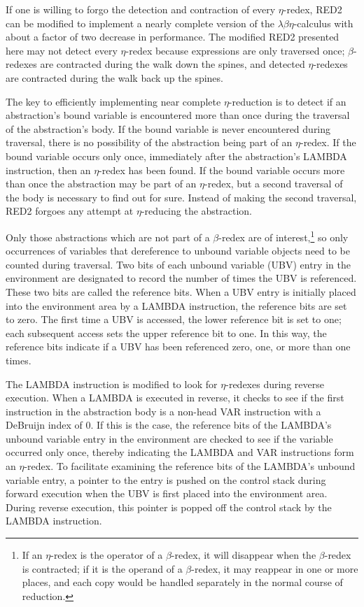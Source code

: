 If one is willing to forgo the detection and contraction of every
\(\eta\)-redex, RED2 can be modified to implement a nearly complete version of
the \(\lambda\beta\eta\)-calculus with about a factor of two decrease in
performance. The modified RED2 presented here may not detect every
\(\eta\)-redex because expressions are only traversed once; \(\beta\)-redexes
are contracted during the walk down the spines, and detected \(\eta\)-redexes
are contracted during the walk back up the spines.

The key to efficiently implementing near complete \(\eta\)-reduction is to
detect if an abstraction's bound variable is encountered more than once during
the traversal of the abstraction's body. If the bound variable is never
encountered during traversal, there is no possibility of the abstraction being
part of an \(\eta\)-redex. If the bound variable occurs only once, immediately
after the abstraction's LAMBDA instruction, then an \(\eta\)-redex has been
found. If the bound variable occurs more than once the abstraction may be part
of an \(\eta\)-redex, but a second traversal of the body is necessary to find
out for sure. Instead of making the second traversal, RED2 forgoes any attempt
at \(\eta\)-reducing the abstraction.

Only those abstractions which are not part of a \(\beta\)-redex are of
interest,\footnote{If an \(\eta\)-redex is the operator of a \(\beta\)-redex, it
will disappear when the \(\beta\)-redex is contracted; if it is the operand of a
\(\beta\)-redex, it may reappear in one or more places, and each copy would be
handled separately in the normal course of reduction.} so only occurrences of
variables that dereference to unbound variable objects need to be counted during
traversal. Two bits of each unbound variable (UBV) entry in the environment are
designated to record the number of times the UBV is referenced. These two bits
are called the reference bits. When a UBV entry is initially placed into the
environment area by a LAMBDA instruction, the reference bits are set to zero.
The first time a UBV is accessed, the lower reference bit is set to one; each
subsequent access sets the upper reference bit to one. In this way, the
reference bits indicate if a UBV has been referenced zero, one, or more than one
times.

The LAMBDA instruction is modified to look for \(\eta\)-redexes during reverse
execution. When a LAMBDA is executed in reverse, it checks to see if the first
instruction in the abstraction body is a non-head VAR instruction with a
DeBruijn index of 0. If this is the case, the reference bits of the LAMBDA's
unbound variable entry in the environment are checked to see if the variable
occurred only once, thereby indicating the LAMBDA and VAR instructions form an
\(\eta\)-redex. To facilitate examining the reference bits of the LAMBDA's
unbound variable entry, a pointer to the entry is pushed on the control stack
during forward execution when the UBV is first placed into the environment
area. During reverse execution, this pointer is popped off the control stack by
the LAMBDA instruction.

